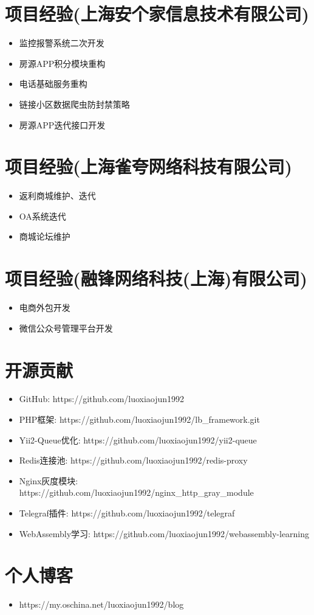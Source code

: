 \documentclass[a4paper,12pt]{article}
\begin{document}
\begin{CJK}{UTF8}{gbsn}
		\section{项目经验(上海安个家信息技术有限公司)}
			\begin{itemize}
				\item{监控报警系统二次开发}
				\item{房源APP积分模块重构}
				\item{电话基础服务重构}
				\item{链接小区数据爬虫防封禁策略}
				\item{房源APP迭代接口开发}
			\end{itemize}
		
		\section{项目经验(上海雀夸网络科技有限公司)}
			\begin{itemize}
				\item{返利商城维护、迭代}
				\item{OA系统迭代}
				\item{商城论坛维护}
			\end{itemize}
			
		\section{项目经验(融锋网络科技(上海)有限公司)}
			\begin{itemize}
				\item{电商外包开发}
				\item{微信公众号管理平台开发}
			\end{itemize}
		
		\section{开源贡献}
		 	\begin{itemize}
				\item{GitHub: https://github.com/luoxiaojun1992}
				\item{PHP框架: https://github.com/luoxiaojun1992/lb\_framework.git}
				\item{Yii2-Queue优化: https://github.com/luoxiaojun1992/yii2-queue}
				\item{Redis连接池: https://github.com/luoxiaojun1992/redis-proxy}
				\item{Nginx灰度模块: https://github.com/luoxiaojun1992/nginx\_http\_gray\_module}
				\item{Telegraf插件: https://github.com/luoxiaojun1992/telegraf}
				\item{WebAssembly学习: https://github.com/luoxiaojun1992/webassembly-learning}
			\end{itemize}
		
		\section{个人博客}
			\begin{itemize}
				\item{https://my.oschina.net/luoxiaojun1992/blog}
			\end{itemize}

	\end{CJK}
\end{document}
